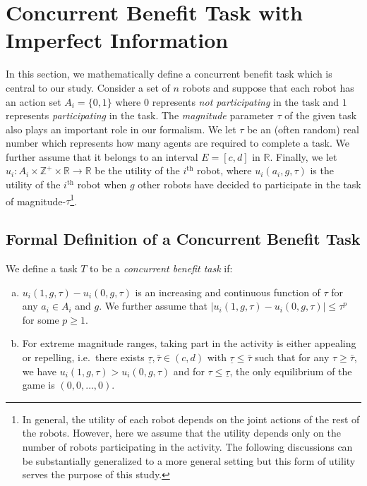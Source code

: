 \documentclass[conference]{ieeeconf}
\def\Z{\mathbb{Z}}
\def\R{\mathbb{R}}
\begin{document}
\section{Concurrent Benefit Task with Imperfect Information}\label{sec:conbenefit}
In this section, we mathematically define a concurrent benefit task which is central to our study. Consider a set of $n$ robots and suppose that each robot has an action set $A_i=\{0,1\}$ where $0$ represents \emph{not participating} in the task and $1$ represents \emph{participating} in the task.  The \emph{magnitude} parameter $\tau$ of the given task also plays an important role in our formalism. We let $\tau$ be an (often random) real number which represents how many agents are required to complete a task. We further assume that it belongs to an interval $E=[c,d]$ in $\R$.  Finally, we let $u_i:A_i\times\Z^+\times \R\to \R$ be the utility of the $i^{\text{th}}$ robot, where $u_i(a_i,g,\tau)$ is the utility of the $i^{\text{th}}$ robot when $g$ other robots have decided to participate in the task of magnitude-$\tau$\footnote{In general, the utility of each robot depends on the joint actions of the rest of the robots. However, here we assume that the utility depends only on the number of robots participating in the activity. The following discussions can be substantially generalized to a more general setting but this form of utility serves the purpose of this study.}. 


\subsection{Formal Definition of a Concurrent Benefit Task}\label{subsec:conbenefitdef}
We define a task $T$ to be a \emph{concurrent benefit task} if: 
\begin{enumerate}[a.]
	\item $u_i(1,g,\tau)-u_i(0,g,\tau)$ is an increasing and continuous function of $\tau$ for any $a_i\in A_i$ and $g$. We further assume that $|u_i(1,g,\tau)-u_i(0,g,\tau)|\leq \tau^p$ for some $p\geq 1$. 
	\item For extreme magnitude ranges, taking part in the activity is either appealing or repelling, i.e.\ there exists $\underline{\tau},\bar{\tau}\in (c,d)$ with $\underline{\tau}\leq \bar{\tau}$ such that for any $\tau\geq \bar{\tau}$, we have $u_i(1,g,\tau)>u_i(0,g,\tau)$ and for $\tau\leq \underline{\tau}$, the only equilibrium of the game is $(0,0,\ldots,0)$. 
\end{enumerate}
\end{document}
